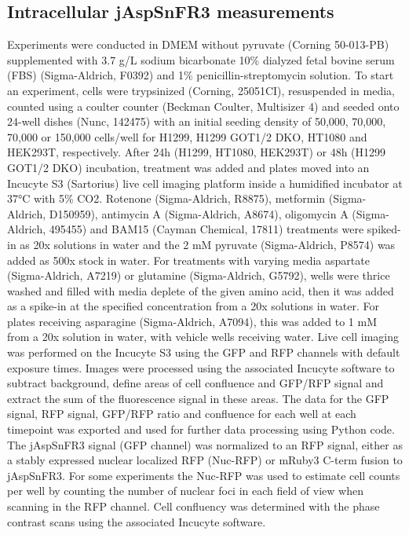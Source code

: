 \documentclass[9pt,lineno]{elife}
\begin{document}
\subsection{Intracellular jAspSnFR3 measurements}
Experiments were conducted in DMEM without pyruvate (Corning 50-013-PB) supplemented with 3.7 g/L sodium bicarbonate 10\% dialyzed fetal bovine serum (FBS) (Sigma-Aldrich, F0392) and 1\% penicillin-streptomycin solution.
To start an experiment, cells were trypsinized (Corning, 25051CI), resuspended in media, counted using a coulter counter (Beckman Coulter, Multisizer 4) and seeded onto 24-well dishes (Nunc, 142475) with an initial seeding density of 50,000, 70,000, 70,000 or 150,000 cells/well for H1299, H1299 GOT1/2 DKO, HT1080 and HEK293T, respectively.
After 24h (H1299, HT1080, HEK293T) or 48h (H1299 GOT1/2 DKO) incubation, treatment was added and plates moved into an Incucyte S3 (Sartorius) live cell imaging platform inside a humidified incubator at 37°C with 5\% CO2.
Rotenone (Sigma-Aldrich, R8875), metformin (Sigma-Aldrich, D150959), antimycin A (Sigma-Aldrich, A8674), oligomycin A (Sigma-Aldrich, 495455) and BAM15 (Cayman Chemical, 17811) treatments were spiked-in as 20x solutions in water and the 2 mM pyruvate (Sigma-Aldrich, P8574) was added as 500x stock in water.
For treatments with varying media aspartate (Sigma-Aldrich, A7219) or glutamine (Sigma-Aldrich, G5792), wells were thrice washed and filled with media deplete of the given amino acid, then it was added as a spike-in at the specified concentration from a 20x solutions in water.
For plates receiving asparagine (Sigma-Aldrich, A7094), this was added to 1 mM from a 20x solution in water, with vehicle wells receiving water.
Live cell imaging was performed on the Incucyte S3 using the GFP and RFP channels with default exposure times.
Images were processed using the associated Incucyte software to subtract background, define areas of cell confluence and GFP/RFP signal and extract the sum of the fluorescence signal in these areas.
The data for the GFP signal, RFP signal, GFP/RFP ratio and confluence for each well at each timepoint was exported and used for further data processing using Python code.
The jAspSnFR3 signal (GFP channel) was normalized to an RFP signal, either as a stably expressed nuclear localized RFP (Nuc-RFP) or mRuby3 C-term fusion to jAspSnFR3.
For some experiments the Nuc-RFP was used to estimate cell counts per well by counting the number of nuclear foci in each field of view when scanning in the RFP channel.
Cell confluency was determined with the phase contrast scans using the associated Incucyte software.
\end{document}
